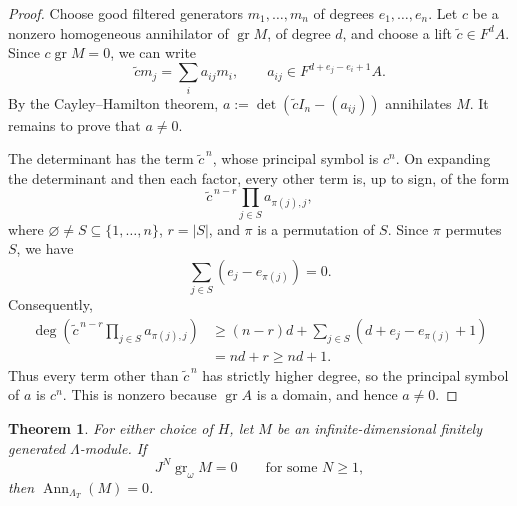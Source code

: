 \documentclass[11pt]{article}
\numberwithin{equation}{section}
\newtheorem{theorem}{Theorem}[section]
\theoremstyle{definition}
\theoremstyle{remark}
\DeclareMathOperator{\gr}{gr}
\DeclareMathOperator{\Ann}{Ann}
\begin{document}
\begin{proof}
Choose good filtered generators $m_1,\ldots,m_n$ of degrees
$e_1,\ldots,e_n$. Let $c$ be a nonzero homogeneous
annihilator of $\gr M$, of degree $d$, and choose a lift
$\widetilde c\in F^dA$. Since $c\gr M=0$, we can write
\[
 \widetilde c m_j=\sum_i a_{ij}m_i,\qquad
 a_{ij}\in F^{d+e_j-e_i+1}A.
\]
By the Cayley--Hamilton theorem,
$a:=\det(\widetilde c I_n-(a_{ij}))$ annihilates $M$.
It remains to prove that $a\ne0$.

The determinant has the term $\widetilde c^{\,n}$, whose principal
symbol is $c^n$. On expanding the determinant and then each factor,
every other term is, up to sign, of the form
\[
 \widetilde c^{\,n-r}\prod_{j\in S}a_{\pi(j),j},
\]
where $\varnothing\ne S\subseteq\{1,\ldots,n\}$, $r=|S|$, and
$\pi$ is a permutation of $S$. 
Since $\pi$ permutes $S$, we have
\[
 \sum_{j\in S}(e_j-e_{\pi(j)})=0.
\]
Consequently,
\[
 \begin{aligned}
 \deg\!\left(\widetilde c^{\,n-r}
             \prod_{j\in S}a_{\pi(j),j}\right)
 &\ge (n-r)d+\sum_{j\in S}(d+e_j-e_{\pi(j)}+1)\\
 &=nd+r\ge nd+1.
 \end{aligned}
\]
Thus every term other than $\widetilde c^{\,n}$ has strictly higher
degree, so the principal symbol of $a$ is $c^n$.
This is nonzero because $\gr A$ is a domain, and hence $a\ne0$.
\end{proof}

\begin{theorem}\label{thm:torus-faithfulness}
For either choice of $H$, let $M$ be an infinite-dimensional
finitely generated $\Lambda$-module. If
\[
 J^N\gr_\omega M=0
 \qquad\text{for some }N\geq1,
\]
then $\Ann_{\Lambda_T}(M)=0$.
\end{theorem}
\end{document}
